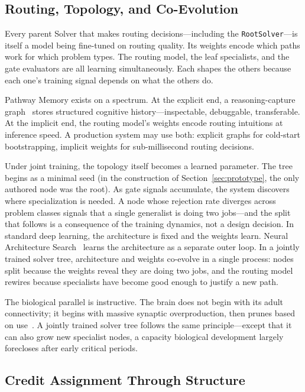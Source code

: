 \documentclass[11pt]{article}
\let\oldtexttt\texttt
\renewcommand{\texttt}[1]{\oldtexttt{\small #1}}
\begin{document}
\subsection{Routing, Topology, and Co-Evolution}

Every parent Solver that makes routing decisions---including the \texttt{RootSolver}---is itself a model being fine-tuned on routing quality. Its weights encode which paths work for which problem types. The routing model, the leaf specialists, and the gate evaluators are all learning simultaneously. Each shapes the others because each one's training signal depends on what the others do.

Pathway Memory exists on a spectrum. At the explicit end, a reasoning-capture graph~\cite{westerberg2026understanding} stores structured cognitive history---inspectable, debuggable, transferable. At the implicit end, the routing model's weights encode routing intuitions at inference speed. A production system may use both: explicit graphs for cold-start bootstrapping, implicit weights for sub-millisecond routing decisions.

Under joint training, the topology itself becomes a learned parameter. The tree begins as a minimal seed (in the construction of Section~\ref{sec:prototype}, the only authored node was the root). As gate signals accumulate, the system discovers where specialization is needed. A node whose rejection rate diverges across problem classes signals that a single generalist is doing two jobs---and the split that follows is a consequence of the training dynamics, not a design decision. In standard deep learning, the architecture is fixed and the weights learn. Neural Architecture Search~\cite{zoph2017nas} learns the architecture as a separate outer loop. In a jointly trained solver tree, architecture and weights co-evolve in a single process: nodes split because the weights reveal they are doing two jobs, and the routing model rewires because specialists have become good enough to justify a new path.

The biological parallel is instructive. The brain does not begin with its adult connectivity; it begins with massive synaptic overproduction, then prunes based on use~\cite{Huttenlocher1979}. A jointly trained solver tree follows the same principle---except that it can also grow new specialist nodes, a capacity biological development largely forecloses after early critical periods.

\subsection{Credit Assignment Through Structure}
\end{document}
